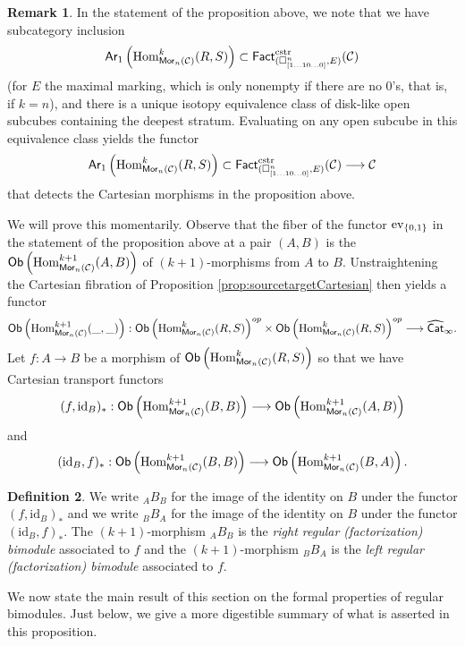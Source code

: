\documentclass[10pt, reqno, twoside
, final
]{amsart}
\numberwithin{equation}{subsection}%
\theoremstyle{definition}
\newtheorem{defn}{Definition}[subsection]
\theoremstyle{definition}
\theoremstyle{definition}
\theoremstyle{definition}
\theoremstyle{definition}
\theoremstyle{definition}
\theoremstyle{definition}
\theoremstyle{definition}
\theoremstyle{definition}
\theoremstyle{plain}
\theoremstyle{definition}
\theoremstyle{plain}
\theoremstyle{definition}
\theoremstyle{plain}
\theoremstyle{definition}
\newtheorem{rmk}[defn]{Remark}
\theoremstyle{definition}
\theoremstyle{plain}
\theoremstyle{plain}
\theoremstyle{definition}
\theoremstyle{plain}
\theoremstyle{plain}
\theoremstyle{plain}
\begin{document}
\begin{rmk}
In the statement of the proposition above, we note that we have subcategory inclusion 
\[\mathsf{Ar}_1\left(\mathrm{Hom}^k_{\mathsf{Mor}_n(\mathcal{C})}(R,S)\right)\subset \mathsf{Fact}^{\mathrm{cstr}}_{(\square^n_{[1\ldots 10\ldots 0]},E)}(\mathcal{C})\] 
(for $E$ the maximal marking, which is only nonempty if there are no 0's, that is, if $k=n$), and there is a unique isotopy equivalence class of disk-like open subcubes containing the deepest stratum. Evaluating on any open subcube in this equivalence class yields the functor 
\[ \mathsf{Ar}_1\left(\mathrm{Hom}^k_{\mathsf{Mor}_n(\mathcal{C})}(R,S)\right)\subset \mathsf{Fact}^{\mathrm{cstr}}_{(\square^n_{[1\ldots 10\ldots 0]},E)}(\mathcal{C})\longrightarrow \mathcal{C}\]    
that detects the Cartesian morphisms in the proposition above.
\end{rmk}
We will prove this momentarily. Observe that the fiber of the functor $\mathrm{ev}_{\{0,1\}}$ in the statement of the proposition above at a pair $(A,B)$ is the \infcat $\mathsf{Ob}\left(\mathrm{Hom}^{k+1}_{\mathsf{Mor}_n(\mathcal{C})}(A,B)\right)$ of $(k+1)$-morphisms from $A$ to $B$. Unstraightening the Cartesian fibration of Proposition \ref{prop:sourcetargetCartesian} then yields a functor
\[ \mathsf{Ob}\left(\mathrm{Hom}^{k+1}_{\mathsf{Mor}_n(\mathcal{C})}(\_,\_)\right):\mathsf{Ob}\left(\mathrm{Hom}^k_{\mathsf{Mor}_n(\mathcal{C})}(R,S)\right)^{op}\times \mathsf{Ob}\left(\mathrm{Hom}^k_{\mathsf{Mor}_n(\mathcal{C})}(R,S)\right)^{op} \longrightarrow \widehat{\mathsf{Cat}}_{\infty}.   \]
Let $f:A\rightarrow B$ be a morphism of $\mathsf{Ob}\left(\mathrm{Hom}^k_{\mathsf{Mor}_n(\mathcal{C})}(R,S)\right)$ so that we have Cartesian transport functors 
\[  (f,\mathrm{id}_B)_*:\mathsf{Ob}\left(\mathrm{Hom}^{k+1}_{\mathsf{Mor}_n(\mathcal{C})}(B,B)\right)\longrightarrow  \mathsf{Ob}\left(\mathrm{Hom}^{k+1}_{\mathsf{Mor}_n(\mathcal{C})}(A,B)\right)\]
and 
\[  (\mathrm{id}_B,f)_*:\mathsf{Ob}\left(\mathrm{Hom}^{k+1}_{\mathsf{Mor}_n(\mathcal{C})}(B,B)\right) \longrightarrow \mathsf{Ob}\left(\mathrm{Hom}^{k+1}_{\mathsf{Mor}_n(\mathcal{C})}(B,A)\right). \]
\begin{defn}
We write ${}_AB_{B}$ for the image of the identity on $B$ under the functor $(f,\mathrm{id}_B)_*$ and we write ${}_BB_A$ for the image of the identity on $B$ under the functor $(\mathrm{id}_B,f)_*$. The $(k+1)$-morphism ${}_AB_{B}$ is the \emph{right regular (factorization) bimodule} associated to $f$ and the $(k+1)$-morphism ${}_BB_A$ is the \emph{left regular (factorization) bimodule} associated to $f$.
\end{defn}
We now state the main result of this section on the formal properties of regular bimodules. Just below, we give a more digestible summary of what is asserted in this proposition.
\end{document}
